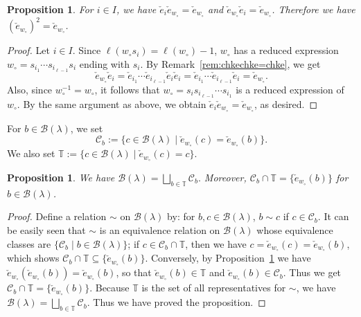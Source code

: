 \documentclass[reqno]{amsart}
\newtheorem{proposition}[theorem]{Proposition}
\theoremstyle{definition}
\theoremstyle{remark}
\numberwithin{equation}{section}
\newcommand{\B}{\mathcal{B}}
\newcommand{\Tfix}{\mathbb{T}}
\newcommand{\wo}{w_\circ}
\newcommand{\chke}{\check e}
\newcommand{\Bl}{\B(\lambda)}
\begin{document}
	\begin{proposition}\label{prop:chkwmax-check-stable}
		For $i\in I$, we have $\chke_i\chke_{w_\circ}=\chke_{w_\circ}$ and $\chke_{w_\circ}\chke_i=\chke_{w_\circ}$.
		Therefore we have $(\chke_{w_\circ})^2=\chke_{w_\circ}$.
	\end{proposition}
	\begin{proof}
		Let $i\in I$.
		Since $\ell(\wo s_i)=\ell(\wo)-1$,
		$\wo$ has a reduced expression
		$\wo=s_{i_1}\cdots s_{i_{\ell-1}}s_i$ ending with $s_i$.
		By Remark~\ref{rem:chkechke=chke},
		we get
		$$\chke_{w_\circ}\chke_i
		=\chke_{i_1}\cdots\chke_{i_{\ell-1}}\chke_i\chke_i
		=\chke_{i_1}\cdots\chke_{i_{\ell-1}}\chke_i=\chke_{w_\circ}.$$
		Also, since $\wo^{-1}=\wo$,
		it follows that $\wo=s_i s_{i_{\ell-1}}\cdots s_{i_1}$ is a reduced expression of $w_\circ$.
		By the same argument as above, we obtain $\chke_i\chke_{w_\circ}=\chke_{w_\circ}$, as desired.
	\end{proof}
	
	For $b\in\Bl$, we set
	\[
	\mathcal{C}_b:=\{c\in\Bl\mid\chke_{\wo}(c)=\chke_{\wo}(b)\}.
	\]
	We also set $\Tfix:=\{c\in\Bl\mid \chke_{\wo}(c)=c\}$.
	
	\begin{proposition}\label{prop:unique-checked-rep}
		We have
		$
		\Bl=\bigsqcup_{b\in\Tfix}\mathcal{C}_b.
		$		
		Moreover, $\mathcal{C}_b\cap\Tfix=\{\chke_{\wo}(b)\}$ for $b\in\Bl$.
	\end{proposition}
	\begin{proof}
		Define a relation $\sim$ on $\Bl$ by:
		for $b,c\in\Bl$, $b\sim c$ if $c\in \mathcal{C}_b$.
		It can be easily seen that $\sim$ is an equivalence relation on $\Bl$ whose equivalence classes are
		$\{\mathcal{C}_b\mid b\in\Bl\}$;
		if $c\in\mathcal{C}_b\cap\mathbb{T}$,
		then we have $c=\chke_{\wo}(c)=\chke_{\wo}(b)$, which shows $\mathcal{C}_b\cap\Tfix\subseteq\{\chke_{\wo}(b)\}$.
		Conversely, by Proposition~\ref{prop:chkwmax-check-stable} we have $\chke_{\wo}(\chke_{\wo}(b))=\chke_{\wo}(b)$,
		so that $\chke_{\wo}(b)\in\Tfix$ and $\chke_{\wo}(b)\in\mathcal{C}_b$.
		Thus we get $\mathcal{C}_b\cap\Tfix=\{\chke_{\wo}(b)\}$.
		Because $\mathbb{T}$ is the set of all representatives for $\sim$,
		we have $\Bl=\bigsqcup_{b\in\Tfix}\mathcal{C}_b$.
		Thus we have proved the proposition.
	\end{proof}
	
\end{document}
